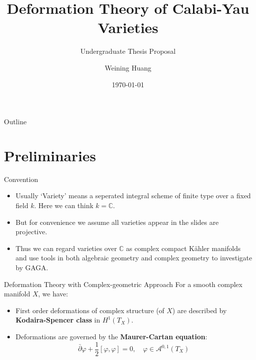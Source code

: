 \documentclass{beamer}
\title{Deformation Theory of Calabi-Yau Varieties}
\subtitle{Undergraduate Thesis Proposal}
\author{Weining Huang}
\institute{Beihang University \\ School of Mathematical Sciences}
\date{\today}
\theoremstyle{definition}
\theoremstyle{plain}
\begin{document}
\begin{frame}
    \thispagestyle{empty}
    \maketitle
\end{frame}

\begin{frame}{Outline}
    \tableofcontents
\end{frame}

\section{Preliminaries}

\begin{frame}{Convention}
    \begin{itemize}
        \item Usually `Variety' means a seperated integral scheme of finite type over a fixed field $ k $. Here we can think $ k=\mathbb{C}  $. 
        \item But for convenience we assume all varieties appear in the slides are projective.
        \item Thus we can regard varieties over $ \mathbb{C} $ as complex compact K\"{a}hler manifolds and use tools in both algebraic geometry and complex geometry to investigate by GAGA.
    \end{itemize}
\end{frame}

\begin{frame}{Deformation Theory with Complex-geometric Approach}
    For a smooth complex manifold $ X $, we have:
    \pause
    \begin{itemize}
        \item First order deformations of complex structure (of $ X $) are described by \textbf{Kodaira-Spencer class} in $ H^1(T_X) $.
        \pause
        \item Deformations are governed by the \textbf{Maurer-Cartan equation}:
        \[
        \bar{\partial} \varphi + \frac{1}{2}[\varphi, \varphi] = 0, \quad \varphi \in \mathcal{A}^{0,1}(T_X)
        \]
    \end{itemize}
\end{frame}
\end{document}
